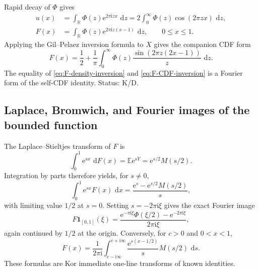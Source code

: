 \documentclass[11pt,oneside]{article}
\numberwithin{equation}{section}
\theoremstyle{definition}
\theoremstyle{remark}
\newcommand{\R}{\mathbb R}
\newcommand{\E}{\mathbb E}
\newcommand{\dd}{\,\mathrm d}
\newcommand{\e}{\mathrm e}
\newcommand{\ii}{\mathrm i}
\newcommand{\statusknown}{\textcolor{deepviolet}{\textsf{K}}}
\newcommand{\statusderived}{\textcolor{derivedblue}{\textsf{D}}}
\begin{document}
Rapid decay of $\Phi$ gives
\begin{align}
 u(x)&=\int_{\R}\Phi(z)\e^{2\pi\ii zx}\,\dd z
      =2\int_0^{\infty}\Phi(z)\cos(2\pi zx)\,\dd z,        \label{eq:u-Fourier-inversion}\\
 F(x)&=\int_{\R}\Phi(z)\e^{2\pi\ii z(x-1)}\,\dd z,
      \qquad 0\le x\le1.                                  \label{eq:F-density-inversion}
\end{align}
Applying the Gil--Pelaez inversion formula to $X$ gives the companion CDF form
\begin{equation}
 F(x)=\frac12+\frac1\pi\int_0^{\infty}
       \Phi(z)\frac{\sin(2\pi z(2x-1))}{z}\,\dd z.         \label{eq:F-CDF-inversion}
\end{equation}
The equality of \eqref{eq:F-density-inversion} and
\eqref{eq:F-CDF-inversion} is a Fourier form of the self-CDF identity.
Status: \statusknown/\statusderived.

\subsection{Laplace, Bromwich, and Fourier images of the bounded function}

The Laplace--Stieltjes transform of $F$ is
\begin{equation}
 \int_0^1\e^{sx}\,\dd F(x)=\E\e^{sY}
 =\e^{s/2}M(s/2).                                          \label{eq:F-LS}
\end{equation}
Integration by parts therefore yields, for $s\ne0$,
\begin{equation}
 \int_0^1\e^{sx}F(x)\,\dd x
 =\frac{\e^s-\e^{s/2}M(s/2)}{s},                           \label{eq:F-Laplace}
\end{equation}
with limiting value $1/2$ at $s=0$.  Setting $s=-2\pi\ii\xi$ gives the exact
Fourier image
\begin{equation}
 \widehat{F\mathbf1_{[0,1]}}(\xi)
 =\frac{\e^{-\pi\ii\xi}\Phi(\xi/2)-\e^{-2\pi\ii\xi}}
        {2\pi\ii\xi},                                    \label{eq:F-Fourier}
\end{equation}
again continued by $1/2$ at the origin.  Conversely, for $c>0$ and
$0<x<1$,
\begin{equation}
 F(x)=\frac1{2\pi\ii}\int_{c-\ii\infty}^{c+\ii\infty}
       \frac{\e^{s(x-1/2)}}{s}M(s/2)\,\dd s.               \label{eq:F-Bromwich}
\end{equation}
These formulas are \statusknown or immediate one-line transforms of known
identities.
\end{document}
